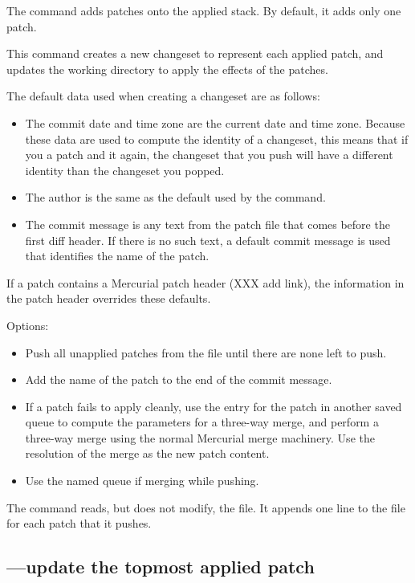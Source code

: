 The  command adds patches onto the applied stack.  By
default, it adds only one patch.

This command creates a new changeset to represent each applied patch,
and updates the working directory to apply the effects of the patches.

The default data used when creating a changeset are as follows:
\begin{itemize}
\item The commit date and time zone are the current date and time
  zone.  Because these data are used to compute the identity of a
  changeset, this means that if you  a patch and
   it again, the changeset that you push will have a
  different identity than the changeset you popped.
\item The author is the same as the default used by the 
  command.
\item The commit message is any text from the patch file that comes
  before the first diff header.  If there is no such text, a default
  commit message is used that identifies the name of the patch.
\end{itemize}
If a patch contains a Mercurial patch header (XXX add link), the
information in the patch header overrides these defaults.

Options:
\begin{itemize}
\item[\hgxopt{mq}{qpush}{-a}] Push all unapplied patches from the
   file until there are none left to push.
\item[\hgxopt{mq}{qpush}{-l}] Add the name of the patch to the end
  of the commit message.
\item[\hgxopt{mq}{qpush}{-m}] If a patch fails to apply cleanly, use the
  entry for the patch in another saved queue to compute the parameters
  for a three-way merge, and perform a three-way merge using the
  normal Mercurial merge machinery.  Use the resolution of the merge
  as the new patch content.
\item[\hgxopt{mq}{qpush}{-n}] Use the named queue if merging while pushing.
\end{itemize}

The  command reads, but does not modify, the
 file.  It appends one line to the 
file for each patch that it pushes.

\subsection{---update the topmost applied patch}

